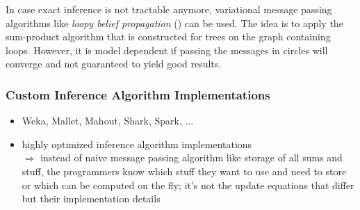 In case exact inference is not tractable anymore, variational message passing algorithms like \emph{loopy belief propagation} (\cite{frey1998revolution}) can be used. The idea is to apply the sum-product algorithm that is constructed for trees on the graph containing loops. However, it is model dependent if passing the messages in circles will converge and not guaranteed to yield good results.

\subsubsection{Custom Inference Algorithm Implementations}
\label{subsec:custom-inference}

\begin{itemize}
\item Weka, Mallet, Mahout, Shark, Spark, ...
\item highly optimized inference algorithm implementations\\
$\Rightarrow$ instead of naive message passing algorithm like storage of all sums and stuff, the programmers know which stuff they want to use and need to store or which can be computed on the fly; it's not the update equations that differ but their implementation details
\end{itemize}

